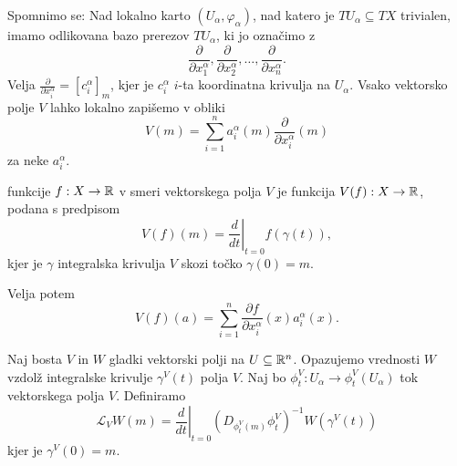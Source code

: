 
Spomnimo se:
Nad lokalno karto $(U_\alpha, \varphi_\alpha)$, nad katero je $T U_\alpha
\subseteq TX$ trivialen, imamo odlikovana bazo prerezov $T U_\alpha$, ki jo
označimo z
\[
  \frac{\partial}{\partial x_1^\alpha}, \frac{\partial}{\partial x_2^\alpha},
  \ldots, \frac{\partial}{\partial x_n^\alpha}.
\]
Velja $\frac{\partial}{\partial x_i^\alpha} = [c_i^\alpha]_m$, kjer je
$c_i^\alpha$ $i$-ta koordinatna krivulja na $U_\alpha$.
Vsako vektorsko polje $V$ lahko lokalno zapišemo v obliki
\[
  V(m) = \sum_{i=1}^n a_i^\alpha(m) \frac{\partial}{\partial x_i^\alpha}(m)
\]
za neke $a_i^\alpha$.

\begin{definicija}
   funkcije $f: X \to \mathbb{R}$ v smeri vektorskega polja $V$ je
  funkcija $V(f): X \to \mathbb{R}$, podana s predpisom
  \[
	V(f)(m) = \left. \frac{d}{dt} \right|_{t=0} f(\gamma(t)),
  \]
  kjer je $\gamma$ integralska krivulja $V$ skozi točko $\gamma(0) = m$.
\end{definicija}

Velja potem
\[
  V(f)(a) = \sum_{i=1}^n \frac{\partial f}{\partial x_i^\alpha}(x)
  a_i^\alpha(x).
\]

Naj bosta $V$ in $W$ gladki vektorski polji na $U \subseteq \mathbb{R}^n$.
Opazujemo vrednosti $W$ vzdolž integralske krivulje $\gamma^V(t)$ polja $V$.
Naj bo $\phi^V_t: U_\alpha \to \phi^V_t(U_\alpha)$ tok vektorskega polja $V$.
Definiramo
\[
  \mathcal{L}_V W(m)
  = \left. \frac{d}{dt} \right|_{t=0} \left( D_{\phi^V_t(m)} \phi^V_t
  \right)^{-1} W(\gamma^V(t))
\]
kjer je $\gamma^V(0) = m$.


